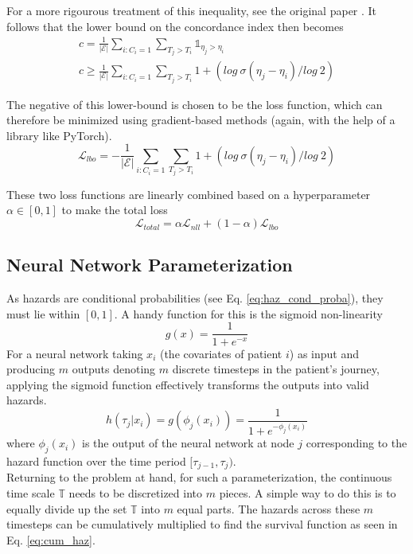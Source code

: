 \documentclass[%
 reprint,
 amsmath,amssymb,
 aps,nofootinbib
]{revtex4-2}
\begin{document}
For a more rigourous treatment of this inequality, see the original paper \cite{raykar_cindex}. It follows that the lower bound on the concordance index then becomes
\begin{gather*}
c = \frac{1}{|\mathcal{E}|}\sum_{i:C_i = 1}\sum_{T_j > T_i} \mathds{1}_{\eta_j > \eta_i}\\
c \ge \frac{1}{|\mathcal{E}|}\sum_{i:C_i = 1}\sum_{T_j > T_i} 1 +  (log\ \sigma(\eta_j - \eta_i)/log\ 2)
\end{gather*}

The negative of this lower-bound is chosen to be the loss function, which can therefore be minimized using gradient-based methods (again, with the help of a library like PyTorch).
\[
\mathcal{L}_{lbo} = -\frac{1}{|\mathcal{E}|}\sum_{i:C_i = 1}\sum_{T_j > T_i} 1 +  (log\ \sigma(\eta_j - \eta_i)/log\ 2)
\]

These two loss functions are linearly combined based on a hyperparameter $\alpha \in [0,1]$ to make the total loss
\[
\mathcal{L}_{total} = \alpha\mathcal{L}_{nll} + (1 - \alpha)\mathcal{L}_{lbo}
\]

\subsection{\label{nn_param}Neural Network Parameterization}
As hazards are conditional probabilities (see Eq. \ref{eq:haz_cond_proba}), they must lie within $[0,1]$. A handy function for this is the sigmoid non-linearity
\[
g(x) = \frac{1}{1+e^{-x}}
\]
For a neural network taking $x_i$ (the covariates of patient $i$) as input and producing $m$ outputs denoting $m$ discrete timesteps in the patient's journey, applying the sigmoid function effectively transforms the outputs into valid hazards.
\[
h(\tau_j|x_i) = g(\phi_j(x_i)) = \frac{1}{1+e^{-\phi_j(x_i)}}
\]
where $\phi_j(x_i)$ is the output of the neural network at node $j$ corresponding to the hazard function over the time period $[\tau_{j-1}, \tau_j)$.\\

Returning to the problem at hand, for such a parameterization, the continuous time scale $\mathbb{T}$ needs to be discretized into $m$ pieces. A simple way to do this is to equally divide up the set $\mathbb{T}$ into $m$ equal parts. The hazards across these $m$ timesteps can be cumulatively multiplied to find the survival function as seen in Eq. \ref{eq:cum_haz}. 
\end{document}
